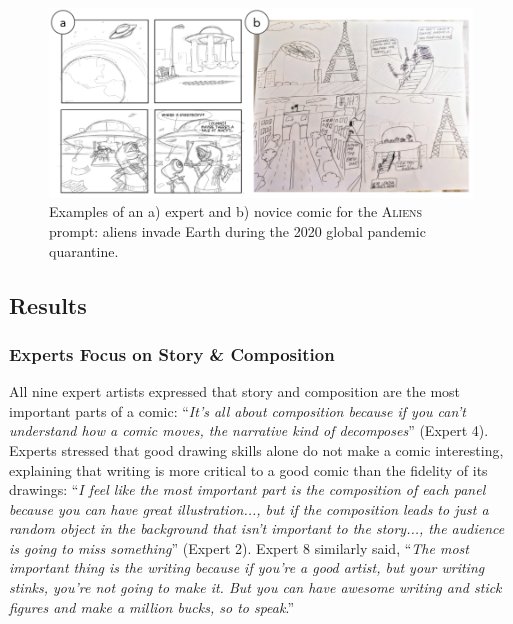 \begin{figure}
  \includegraphics[width=\textwidth]{shown/figures/study1.png}
  \caption{Examples of an a) expert and b) novice comic for the \textsc{Aliens} prompt: aliens invade Earth during the 2020 global pandemic quarantine.}
  \label{fig:study1}
\end{figure}

\subsection{Results}

\subsubsection{Experts Focus on Story \& Composition}
All nine expert artists expressed that story and composition are the most important parts of a comic: ``\textit{It’s all about composition because if you can’t understand how a comic moves, the narrative kind of decomposes}'' (Expert 4). Experts stressed that good drawing skills alone do not make a comic interesting, explaining that writing is more critical to a good comic than the fidelity of its drawings: ``\textit{I feel like the most important part is the composition of each panel because you can have great illustration..., but if the composition leads to just a random object in the background that isn’t important to the story..., the audience is going to miss something}'' (Expert 2).
Expert 8 similarly said, ``\textit{The most important thing is the writing because if you’re a good artist, but your writing stinks, you’re not going to make it. But you can have awesome writing and stick figures and make a million bucks, so to speak}.'' 

